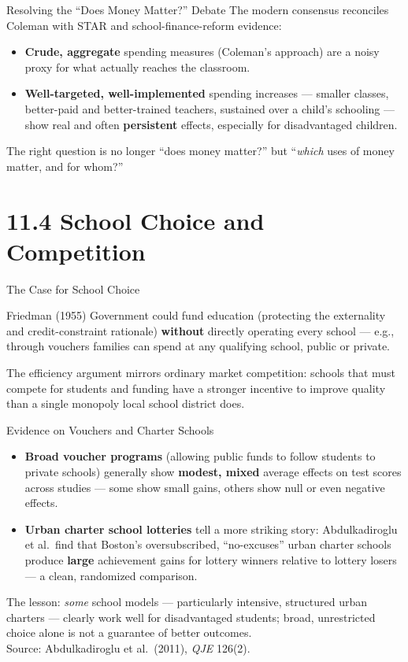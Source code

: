 \documentclass[11pt,aspectratio=169]{beamer}
\newcommand{\srcnote}[1]{{\footnotesize\color{wugray}Source: #1}}
\begin{document}
\begin{frame}{Resolving the ``Does Money Matter?'' Debate}
  The modern consensus reconciles Coleman with STAR and school-finance-reform evidence:
  \begin{itemize}
    \item \textbf{Crude, aggregate} spending measures (Coleman's approach) are a noisy proxy for what actually reaches the classroom.
    \item \textbf{Well-targeted, well-implemented} spending increases --- smaller classes, better-paid and better-trained teachers, sustained over a child's schooling --- show real and often \textbf{persistent} effects, especially for disadvantaged children.
  \end{itemize}
  \small The right question is no longer ``does money matter?'' but ``\emph{which} uses of money matter, and for whom?''
\end{frame}

\section{11.4 School Choice and Competition}

\begin{frame}{The Case for School Choice}
  \begin{block}{Friedman (1955)}
    Government could fund education (protecting the externality and credit-constraint rationale) \textbf{without} directly operating every school --- e.g., through vouchers families can spend at any qualifying school, public or private.
  \end{block}
  \vspace{0.4em}
  \small The efficiency argument mirrors ordinary market competition: schools that must compete for students and funding have a stronger incentive to improve quality than a single monopoly local school district does.
\end{frame}

\begin{frame}{Evidence on Vouchers and Charter Schools}
  \begin{itemize}
    \item \textbf{Broad voucher programs} (allowing public funds to follow students to private schools) generally show \textbf{modest, mixed} average effects on test scores across studies --- some show small gains, others show null or even negative effects.
    \item \textbf{Urban charter school lotteries} tell a more striking story: Abdulkadiroglu et al.\ find that Boston's oversubscribed, ``no-excuses'' urban charter schools produce \textbf{large} achievement gains for lottery winners relative to lottery losers --- a clean, randomized comparison.
  \end{itemize}
  \small The lesson: \emph{some} school models --- particularly intensive, structured urban charters --- clearly work well for disadvantaged students; broad, unrestricted choice alone is not a guarantee of better outcomes.\\
  \srcnote{Abdulkadiroglu et al.\ (2011), \emph{QJE} 126(2).}
\end{frame}
\end{document}
